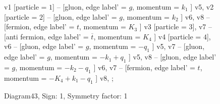 \documentclass{revtex4}
\begin{document}
\begin{figure}[!htb]
\begin{center}
{    %
v1 [particle = \(1\)] -- [gluon, edge label' = \(g\), momentum = \(k_{1}\) ] v5, 
v2 [particle = \(2\)] -- [gluon, edge label' = \(g\), momentum = \(k_{2}\) ] v6, 
v8 -- [fermion, edge label' = \(t\), momentum = \(K_{3}\) ] v3 [particle = \(3\)], 
v7 -- [anti fermion, edge label' = \(\overline{t}\), momentum = \(K_{4}\) ] v4 [particle = \(4\)], 
v6 -- [gluon, edge label' = \(g\), momentum = \(-q_{1}\) ] v5, 
v7 -- [gluon, edge label' = \(g\), momentum = \(-k_{1} + q_{1}\) ] v5, 
v8 -- [gluon, edge label' = \(g\), momentum = \(-k_{2} - q_{1}\) ] v6, 
v7 -- [fermion, edge label' = \(t\), momentum = \(-K_{4} + k_{1} - q_{1}\) ] v8, 
};
\end{center}
\caption{Diagram43, Sign: 1, Symmetry factor: 1}
\end{figure}
\newpage
\end{document}
